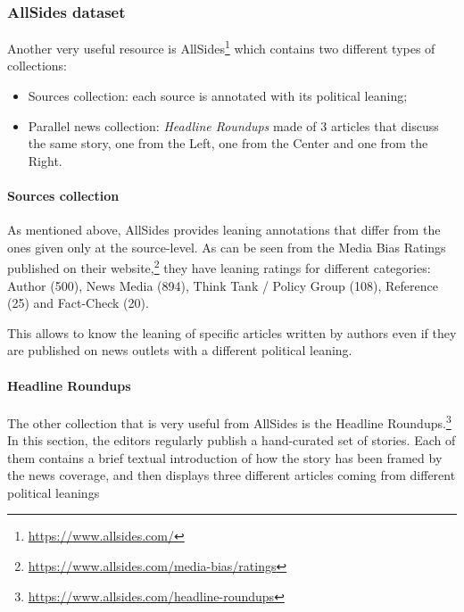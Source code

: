 \subsubsection{AllSides dataset}

Another very useful resource is AllSides\footnote{\url{https://www.allsides.com/}} which contains two different types of collections:

\begin{itemize}
    \item Sources collection: each source is annotated with its political leaning;
    \item Parallel news collection: \emph{Headline Roundups\texttrademark} made of 3 articles that discuss the same story, one from the Left, one from the Center and one from the Right.
\end{itemize}

\paragraph{Sources collection}

As mentioned above, AllSides provides leaning annotations that differ from  the ones given only at the source-level.
As can be seen from the Media Bias Ratings published on their website,\footnote{\url{https://www.allsides.com/media-bias/ratings}} they have leaning ratings for different categories: Author (500), News Media (894), Think Tank / Policy Group (108), Reference (25) and Fact-Check (20).

This allows to know the leaning of specific articles written by authors even if they are published on news outlets with a different political leaning. 


\paragraph{Headline Roundups\texttrademark}

The other collection that is very useful from AllSides is the Headline Roundups\texttrademark.\footnote{\url{https://www.allsides.com/headline-roundups}} In this section, the editors regularly publish a hand-curated set of stories. Each of them contains a brief textual introduction of how the story has been framed by the news coverage, and then displays three different articles coming from different political leanings


